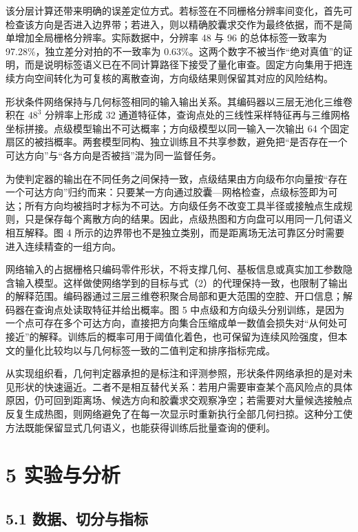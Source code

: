 该分层计算还带来明确的误差定位方式。若标签在不同栅格分辨率间变化，首先可检查该方向是否进入边界带；若进入，则以精确胶囊求交作为最终依据，而不是简单增加全局栅格分辨率。实际数据中，分辨率 48 与 96 的总体标签一致率为 97.28\%，独立差分对拍的不一致率为 0.63\%。这两个数字不被当作``绝对真值''的证明，而是说明标签语义已在不同计算路径下接受了量化审查。固定方向集用于把连续方向空间转化为可复核的离散查询，方向级结果则保留其对应的风险结构。

形状条件网络保持与几何标签相同的输入输出关系。其编码器以三层无池化三维卷积在 \(48^3\) 分辨率上形成 32 通道特征体，查询点处的三线性采样特征再与三维网格坐标拼接。点级模型输出不可达概率；方向级模型以同一输入一次输出 64 个固定扇区的被挡概率。两套模型同构、独立训练且不共享参数，避免把``是否存在一个可达方向''与``各方向是否被挡''混为同一监督任务。

为使判定器的输出在不同任务之间保持一致，点级结果由方向级布尔向量按``存在一个可达方向''归约而来：只要某一方向通过胶囊---网格检查，点级标签即为可达；所有方向均被挡时才标为不可达。方向级任务不改变工具半径或接触点生成规则，只是保存每个离散方向的结果。因此，点级热图和方向盘可以用同一几何语义相互解释。图 4 所示的边界带也不是独立类别，而是距离场无法可靠区分时需要进入连续精查的一组方向。

网络输入的占据栅格只编码零件形状，不将支撑几何、基板信息或真实加工参数隐含输入模型。这样做使网络学到的目标与式（2）的代理保持一致，也限制了输出的解释范围。编码器通过三层三维卷积聚合局部和更大范围的空腔、开口信息；解码器在查询点处读取特征并给出概率。图 5 中点级和方向级头分别训练，是因为一个点可存在多个可达方向，直接把方向集合压缩成单一数值会损失对``从何处可接近''的解释。训练后的概率可用于阈值化着色，也可保留为连续风险强度，但本文的量化比较均以与几何标签一致的二值判定和排序指标完成。

从实现组织看，几何判定器承担的是标注和评测参照，形状条件网络承担的是对未见形状的快速逼近。二者不是相互替代关系：若用户需要审查某个高风险点的具体原因，仍可回到距离场、候选方向和胶囊求交观察净空；若需要对大量候选接触点反复生成热图，则网络避免了在每一次显示时重新执行全部几何扫掠。这种分工使方法既能保留显式几何语义，也能获得训练后批量查询的便利。

\section{5 实验与分析}\label{ux5b9eux9a8cux4e0eux5206ux6790}

\subsection{5.1 数据、切分与指标}\label{ux6570ux636eux5207ux5206ux4e0eux6307ux6807}

